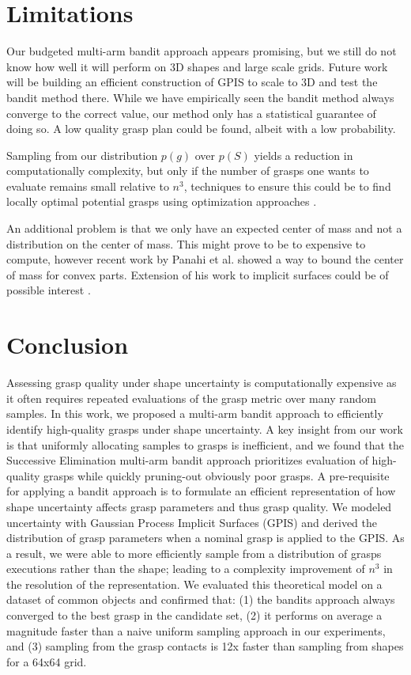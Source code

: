 \documentclass[letterpaper, 10 pt, conference]{ieeeconf}  %
\begin{document}
\section{Limitations} 

Our budgeted multi-arm bandit approach appears promising, but we still do not know how well it will perform on 3D shapes and large scale grids. Future work will be building an efficient construction of GPIS to scale to 3D and test the bandit method there. While we have empirically seen the bandit method always converge to the correct value, our method only has a statistical guarantee of doing so. A low quality grasp plan could be found, albeit with a low probability. 

Sampling from our distribution $p(g)$ over $p(S)$ yields a reduction in computationally complexity, but only if the number of grasps one wants to evaluate remains small relative to $n^3$, techniques to ensure this could be to find locally optimal potential grasps using optimization approaches \cite{mahler2015opt}. 

An additional problem is that we only have an expected center of mass and not a distribution on the center of mass. This might prove to be to expensive to compute, however recent work by Panahi et al. showed a way to bound the center of mass for convex parts. Extension of his work to implicit surfaces could be of possible interest \cite{panahi2014bounding}.  

\section{Conclusion}
Assessing grasp quality under shape uncertainty is computationally expensive as it often requires repeated evaluations of the grasp metric over many random samples.
In this work, we proposed a multi-arm bandit approach to efficiently identify high-quality grasps under shape uncertainty. 
A key insight from our work is that uniformly allocating samples to grasps is inefficient, and
 we found that the Successive Elimination multi-arm bandit approach prioritizes evaluation of high-quality grasps while quickly pruning-out obviously poor grasps.
A pre-requisite for applying a bandit approach is to formulate an efficient representation of how shape uncertainty affects grasp parameters and thus grasp quality.
We modeled uncertainty with Gaussian Process Implicit Surfaces (GPIS) and derived the distribution of grasp parameters when a nominal grasp is applied to the GPIS.
As a result, we were able to more efficiently sample from a distribution of grasps executions rather than the shape; leading to a complexity improvement of $n^3$ in the resolution of the representation.
We evaluated this theoretical model on a dataset of common objects and confirmed that: (1) the bandits approach always converged to the best grasp in the candidate set, (2) it performs on average a magnitude faster than a naive uniform sampling approach in our experiments, and (3) sampling from the grasp contacts is 12x faster than sampling from shapes for a 64x64 grid.
\end{document}

